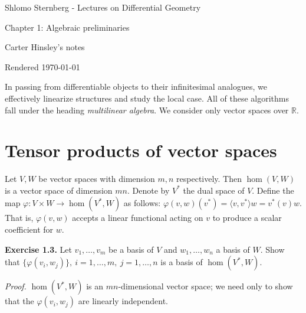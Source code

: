 \documentclass[a4paper]{article}
\newcommand{\R}{\mathbb{R}}
\begin{document}
\begin{center}
\LARGE{Shlomo Sternberg - Lectures on Differential Geometry}

\Large{Chapter 1: Algebraic preliminaries}

\large{Carter Hinsley's notes}

Rendered \today
\end{center}

In passing from differentiable objects to their infinitesimal analogues, we effectively linearize structures and study the local case. All of these algorithms fall under the heading \emph{multilinear algebra}. We consider only vector spaces over $\R$.

\section{Tensor products of vector spaces}

Let $V, W$ be vector spaces with dimension $m, n$ respectively. Then $\hom(V, W)$ is a vector space of dimension $mn$. Denote by $V^*$ the dual space of $V$. Define the map $\varphi : V \times W \to \hom(V^*, W)$ as follows: $\varphi(v, w)(v^*) = \langle v, v^* \rangle w = v^*(v) w$. That is, $\varphi(v, w)$ accepts a linear functional acting on $v$ to produce a scalar coefficient for $w$.

\textbf{Exercise 1.3.} Let $v_1, \ldots, v_m$ be a basis of $V$ and $w_1, \ldots, w_n$ a basis of $W$. Show that $\{\varphi(v_i, w_j)\},\ i = 1, \ldots, m,\ j = 1, \ldots, n$ is a basis of $\hom(V^*, W)$.

\emph{Proof.} $\hom(V^*, W)$ is an $mn$-dimensional vector space; we need only to show that the $\varphi(v_i, w_j)$ are linearly independent. 
\end{document}

